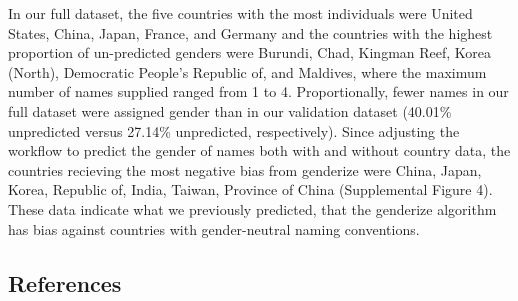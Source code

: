 \documentclass[11pt,]{article}
\begin{document}
In our full dataset, the five countries with the most individuals were
United States, China, Japan, France, and Germany and the countries with
the highest proportion of un-predicted genders were Burundi, Chad,
Kingman Reef, Korea (North), Democratic People's Republic of, and
Maldives, where the maximum number of names supplied ranged from 1 to 4.
Proportionally, fewer names in our full dataset were assigned gender
than in our validation dataset (40.01\% unpredicted versus 27.14\%
unpredicted, respectively). Since adjusting the workflow to predict the
gender of names both with and without country data, the countries
recieving the most negative bias from genderize were China, Japan,
Korea, Republic of, India, Taiwan, Province of China (Supplemental
Figure 4). These data indicate what we previously predicted, that the
genderize algorithm has bias against countries with gender-neutral
naming conventions.

\subsection{References}\label{references}
\end{document}
